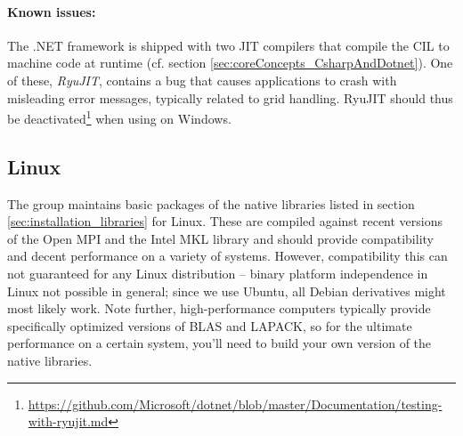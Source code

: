 \documentclass[a4paper,10pt]{report} %
\begin{document}
\paragraph{Known issues:}
The .NET framework is shipped with two JIT compilers that compile the CIL to machine code at runtime (cf. section \ref{sec:coreConcepts_CsharpAndDotnet}). One of these, \emph{RyuJIT}, contains a bug that causes \BoSSS{} applications to crash with misleading error messages, typically related to grid handling. RyuJIT should thus be deactivated\footnote{\url{https://github.com/Microsoft/dotnet/blob/master/Documentation/testing-with-ryujit.md}} when using \BoSSS{} on Windows.


\subsection{Linux}
The \BoSSS{} group maintains basic packages of the native libraries listed in section \ref{sec:installation_libraries} for Linux.
These are compiled against recent versions of the Open MPI and the Intel MKL library
and should provide compatibility and decent performance on a variety of systems.
However, compatibility this can not guaranteed for any Linux distribution -- binary platform independence in Linux not possible in general; since we use Ubuntu, all Debian derivatives might most likely work.
Note further, high-performance computers typically provide specifically optimized versions of BLAS and LAPACK, so for the ultimate performance on a certain system,
you'll need to build your own version of the \BoSSS{} native libraries.
\end{document}
